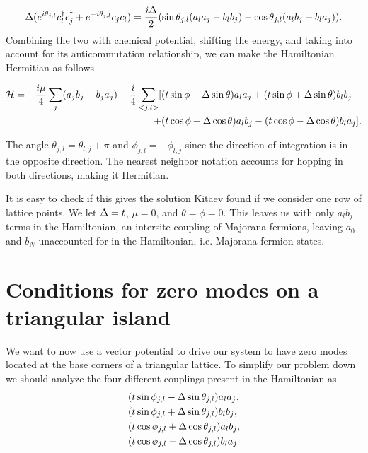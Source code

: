 \begin{equation}
  \Delta ( e^{i\theta_{j,l}} c^{\dagger}_l c^{\dagger}_j + e^{-i\theta_{j,l}} c_j c_l) = \dfrac{i\Delta}{2} ( \sin\theta_{j,l} (a_l a_j - b_l b_j) - \cos\theta_{j,l} (a_l b_j + b_l a_j) ).
\end{equation}
Combining the two with chemical potential, shifting the energy, and taking into account for its anticommutation relationship, we can make the Hamiltonian Hermitian as follows
\begin{strip}
\begin{align}
  \mathcal{H} = -\dfrac{i\mu}{4} \sum_j (a_j b_j - b_j a_j) - \dfrac{i}{4} \sum_{<j,l>} [&(t\sin\phi-\Delta\sin\theta) a_l a_j + (t\sin\phi+\Delta\sin\theta) b_l b_j \nonumber \\
  +&(t\cos\phi+\Delta\cos\theta) a_l b_j - (t\cos\phi-\Delta\cos\theta) b_l a_j].
\end{align}
\end{strip}
The angle $\theta_{j,l} = \theta_{l,j}+\pi$ and $\phi_{j,l} = -\phi_{l,j}$ since the direction of integration is in the opposite direction.
The nearest neighbor notation accounts for hopping in both directions, making it Hermitian.

It is easy to check if this gives the solution Kitaev found if we consider one row of lattice points.
We let $\Delta = t$, $\mu=0$, and $\theta = \phi = 0$.
This leaves us with only $a_l b_j$ terms in the Hamiltonian, an intersite coupling of Majorana fermions, leaving $a_0$ and $b_N$ unaccounted for in the Hamiltonian, i.e. Majorana fermion states.

\section{Conditions for zero modes on a triangular island}

\par
We want to now use a vector potential to drive our system to have zero modes located at the base corners of a triangular lattice.
To simplify our problem down we should analyze the four different couplings present in the Hamiltonian as
\begin{align}
  &(t \sin\phi_{j,l} - \Delta \sin\theta_{j,l}) a_l a_j, \\
  &(t \sin\phi_{j,l} + \Delta \sin\theta_{j,l}) b_l b_j, \\
  &(t \cos\phi_{j,l} + \Delta \cos\theta_{j,l}) a_l b_j, \\
  &(t \cos\phi_{j,l} - \Delta \cos\theta_{j,l}) b_l a_j
\end{align}

